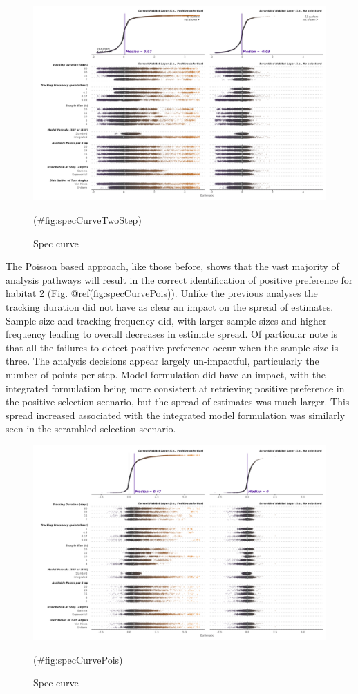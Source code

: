 \documentclass[10pt,a4paper]{article}
\begin{document}
\begin{figure}
\includegraphics[width=1\linewidth]{../figures/twoStep_specCurve} \caption{Spec curve}(\#fig:specCurveTwoStep)
\end{figure}

The Poisson based approach, like those before, shows that the vast majority of analysis pathways will result in the correct identification of positive preference for habitat 2 (Fig. @ref(fig:specCurvePois)).
Unlike the previous analyses the tracking duration did not have as clear an impact on the spread of estimates.
Sample size and tracking frequency did, with larger sample sizes and higher frequency leading to overall decreases in estimate spread.
Of particular note is that all the failures to detect positive preference occur when the sample size is three.
The analysis decisions appear largely un-impactful, particularly the number of points per step.
Model formulation did have an impact, with the integrated formulation being more consistent at retrieving positive preference in the positive selection scenario, but the spread of estimates was much larger.
This spread increased associated with the integrated model formulation was similarly seen in the scrambled selection scenario.

\begin{figure}
\includegraphics[width=1\linewidth]{../figures/pois_specCurve} \caption{Spec curve}(\#fig:specCurvePois)
\end{figure}
\end{document}
